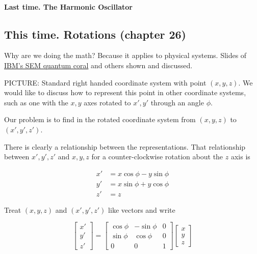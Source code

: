 %
%

\paragraph{Last time.  The Harmonic Oscillator}

\subsection{This time.  Rotations (chapter 26)}

Why are we doing the math?  Because it applies to physical systems.  Slides of \href{http://www.almaden.ibm.com/vis/stm/images/stm.gif}{IBM's SEM quantum coral} and others shown and discussed.

PICTURE: Standard right handed coordinate system with point $(x,y,z)$. We would like to discuss how to represent this point in other coordinate systems, such as one with the $x,y$ axes rotated to $x',y'$ through an angle $\phi$.

Our problem is to find in the rotated coordinate system from $(x,y,z)$ to $(x', y', z')$.

There is clearly a relationship between the representations.  That relationship between $x', y', z'$ and $x,y,z$ for a counter-clockwise rotation about the $z$ axis is

\begin{align}\label{eqn:PHY356FDec7:10}
x' &= x \cos \phi - y \sin\phi \\
y' &= x \sin \phi + y \cos\phi \\
z' &= z
\end{align}

Treat $(x,y,z)$ and $(x',y',z')$ like vectors and write

\begin{equation}\label{eqn:PHY356FDec7:20}
\begin{bmatrix}
x'  \\
y' \\
z'
\end{bmatrix}
=
\begin{bmatrix}
\cos \phi &- \sin\phi & 0 \\
\sin \phi & \cos\phi & 0 \\
0 & 0 & 1
\end{bmatrix}
\begin{bmatrix}
x  \\
y \\
z
\end{bmatrix}
\end{equation}

